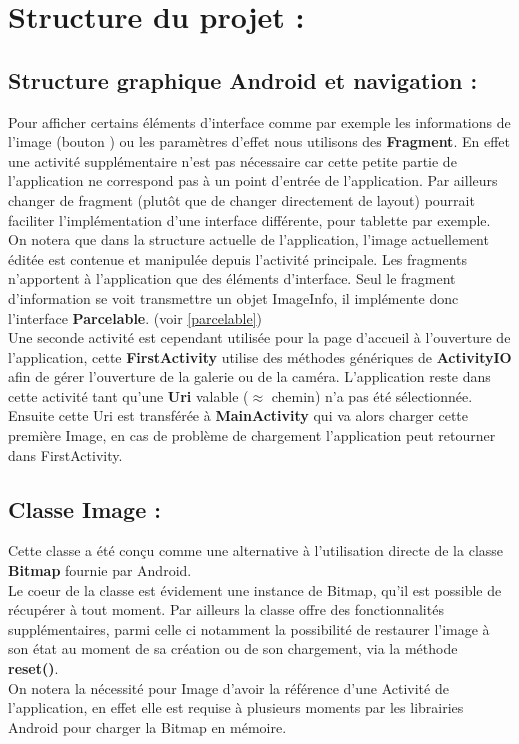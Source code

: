 \section{Structure du projet :}

\subsection{Structure graphique Android et navigation :} \label{navig}
Pour afficher certains éléments d'interface comme par exemple les informations de l'image (bouton \faInfoCircle) ou les paramètres d'effet nous utilisons des \textbf{Fragment}. En effet une activité supplémentaire n'est pas nécessaire car cette petite partie de l'application ne correspond pas à un point d'entrée de l'application. Par ailleurs changer de fragment (plutôt que de changer directement de layout) pourrait faciliter l'implémentation d'une interface différente, pour tablette par exemple.
\\

On notera que dans la structure actuelle de l'application, l'image actuellement éditée est contenue et manipulée depuis l'activité principale. Les fragments n'apportent à l'application que des éléments d'interface. Seul le fragment d'information se voit transmettre un objet ImageInfo, il implémente donc l'interface \textbf{Parcelable}. (voir \ref{parcelable})
\\

Une seconde activité est cependant utilisée pour la page d'accueil à l'ouverture de l'application, cette \textbf{FirstActivity} utilise des méthodes génériques de \textbf{ActivityIO} afin de gérer l'ouverture de la galerie ou de la caméra. L'application reste dans cette activité tant qu'une \textbf{Uri} valable ($\approx$ chemin) n'a pas été sélectionnée. Ensuite cette Uri est transférée à \textbf{MainActivity} qui va alors charger cette première Image, en cas de problème de chargement l'application peut retourner dans FirstActivity.

\subsection{Classe \textbf{Image} :} \label{classeImage}
Cette classe a été conçu comme une alternative à l'utilisation directe de la classe \textbf{Bitmap} fournie par Android.
\\
Le coeur de la classe est évidement une instance de Bitmap, qu'il est possible de récupérer à tout moment. Par ailleurs la classe offre des fonctionnalités supplémentaires, parmi celle ci notamment la possibilité de restaurer l'image à son état au moment de sa création ou de son chargement, via la méthode \textbf{reset()}.
\\
On notera la nécessité pour Image d'avoir la référence d'une Activité de l'application, en effet elle est requise à plusieurs moments par les librairies Android pour charger la Bitmap en mémoire.

